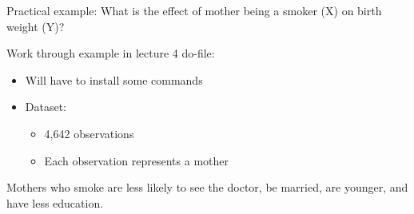 \begin{comment}
\begin{frame}{Steps for a NN analysis with caliper}
\begin{itemize}
	\item Develop a propensity model and estimate the propensities
	\item Check for common support
	\item Create the size of the caliper
	\item Match using the caliper
	\item Check that means for your covariates are equivalent for treated and controls 
	\item Test for differences between the two groups ($t$-test or multivariate)
	\item Ask whether your results hold qualitatively for population
\end{itemize}
\end{frame}

\end{comment}

\begin{frame}{Practical example: What is the effect of mother being a smoker (X) on birth weight (Y)?}

	Work through example in lecture 4 do-file:
	\begin{itemize}
		\item Will have to install some commands
		\item Dataset:
		\begin{itemize}
			\item 4,642 observations
			\item Each observation represents a mother
		\end{itemize}
	\end{itemize}
		
	\begin{table}[htbp]
	  \centering
	\end{table}%

	\vspace{3mm} 
	
	Mothers who smoke are less likely to see the doctor, be married, are younger, and have less education.


\end{frame}





